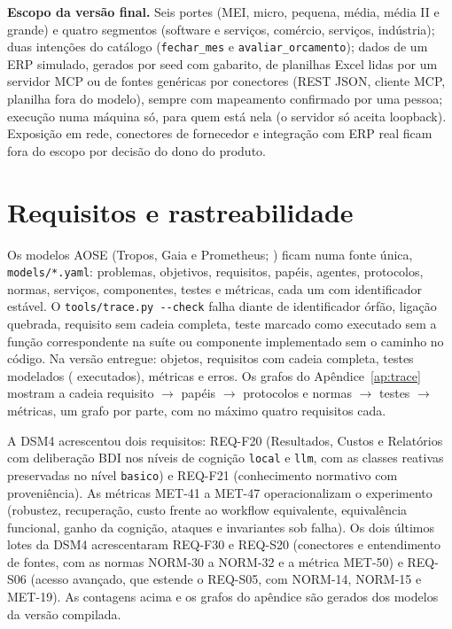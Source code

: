 \documentclass[10pt,a4paper]{article}
\newcommand{\code}[1]{\texttt{#1}}
\begin{document}
\textbf{Escopo da versão final.} Seis portes (MEI, micro, pequena, média, média II e grande) e quatro segmentos
(software e serviços, comércio, serviços, indústria); duas intenções do catálogo (\code{fechar\_mes} e
\code{avaliar\_orcamento}); dados de um ERP simulado, gerados por seed com gabarito, de planilhas Excel lidas por
um servidor MCP ou de fontes genéricas por conectores (REST JSON, cliente MCP, planilha fora do modelo), sempre com
mapeamento confirmado por uma pessoa; execução numa máquina só, para quem está nela (o servidor só aceita
loopback). Exposição em rede, conectores de fornecedor e integração com ERP real ficam fora do escopo por decisão do
dono do produto.

\section{Requisitos e rastreabilidade}
Os modelos AOSE (Tropos, Gaia e Prometheus; \cite{bresciani2004,wooldridge2000,padgham2004}) ficam numa fonte única,
\code{models/*.yaml}: problemas, objetivos, requisitos, papéis, agentes, protocolos, normas, serviços, componentes,
testes e métricas, cada um com identificador estável. O \code{tools/trace.py -{}-check} falha diante de identificador
órfão, ligação quebrada, requisito sem cadeia completa, teste marcado como executado sem a função correspondente na
suíte ou componente implementado sem o caminho no código. Na versão entregue:  objetos,
 requisitos com cadeia completa,  testes modelados (
executados),  métricas e  erros. Os  grafos do
Apêndice~\ref{ap:trace} mostram a cadeia requisito $\rightarrow$ papéis $\rightarrow$ protocolos e normas
$\rightarrow$ testes $\rightarrow$ métricas, um grafo por parte, com no máximo quatro requisitos cada.

A DSM4 acrescentou dois requisitos: REQ-F20 (Resultados, Custos e Relatórios com deliberação BDI nos níveis de
cognição \code{local} e \code{llm}, com as classes reativas preservadas no nível \code{basico}) e REQ-F21
(conhecimento normativo com proveniência). As métricas MET-41 a MET-47 operacionalizam o experimento (robustez,
recuperação, custo frente ao workflow equivalente, equivalência funcional, ganho da cognição, ataques e invariantes
sob falha). Os dois últimos lotes da DSM4 acrescentaram REQ-F30 e REQ-S20 (conectores e entendimento de fontes,
com as normas NORM-30 a NORM-32 e a métrica MET-50) e REQ-S06 (acesso avançado, que estende o REQ-S05, com NORM-14,
NORM-15 e MET-19). As contagens acima e os grafos do apêndice são gerados dos modelos da versão compilada.
\end{document}
